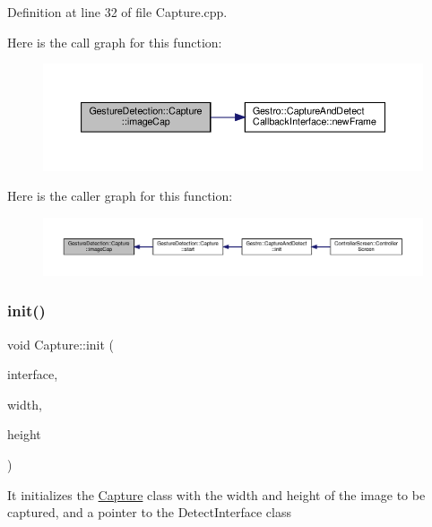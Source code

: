 Definition at line 32 of file Capture.\+cpp.

Here is the call graph for this function\+:
\nopagebreak
\begin{figure}[H]
\begin{center}
\leavevmode
\includegraphics[width=350pt]{class_gesture_detection_1_1_capture_a010b666cb1482b235f8282867e8f1b97_cgraph}
\end{center}
\end{figure}
Here is the caller graph for this function\+:
\nopagebreak
\begin{figure}[H]
\begin{center}
\leavevmode
\includegraphics[width=350pt]{class_gesture_detection_1_1_capture_a010b666cb1482b235f8282867e8f1b97_icgraph}
\end{center}
\end{figure}
\mbox{\label{class_gesture_detection_1_1_capture_aaff420636b6bac6593789344cc990580}} 
\subsubsection{\texorpdfstring{init()}{init()}}
{\footnotesize\ttfamily void Capture\+::init (\begin{DoxyParamCaption}\item[{\hyperlink{class_gestro_1_1_capture_and_detect_callback_interface}{Gestro\+::\+Capture\+And\+Detect\+Callback\+Interface} $\ast$}]{interface,  }\item[{int}]{width,  }\item[{int}]{height }\end{DoxyParamCaption})}

It initializes the \hyperlink{class_gesture_detection_1_1_capture}{Capture} class with the width and height of the image to be captured, and a pointer to the Detect\+Interface class


